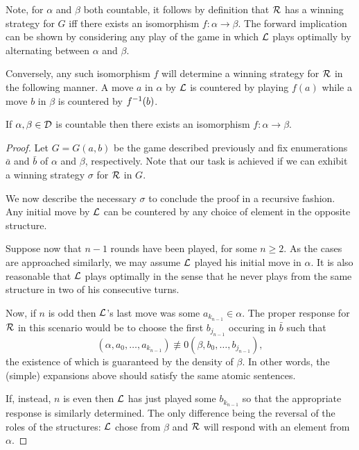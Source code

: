 Note, for $\alpha$ and $\beta$ both countable, it follows by definition
that $\mathcal{R}$ has a winning strategy for $G$ iff there exists an isomorphism
$f\colon\alpha\to\beta$.  The forward implication can be shown by considering
any play of the game in which $\mathcal{L}$ plays optimally by alternating between
$\alpha$ and $\beta$.

Conversely, any such isomorphism $f$ will determine a winning strategy for
$\mathcal{R}$ in the following manner.  A move $a$ in $\alpha$ by $\mathcal{L}$ is
countered by playing $f(a)$ while a move $b$ in $\beta$ is countered by
${f}^{-1}(b)$.

\begin{thm}\label{thm:cantor}
	If $\alpha,\beta\in\mathcal{D}$ is countable then there exists an isomorphism
	$f\colon\alpha\to\beta$.
\end{thm}
\begin{proof}
	Let $G=G(a,b)$ be the game described previously and fix enumerations
	$\bar{a}$ and $\bar{b}$ of $\alpha$ and $\beta$, respectively.  Note that
	our task is achieved if we can exhibit a winning strategy $\sigma$ for
	$\mathcal{R}$ in $G$.

	We now describe the necessary $\sigma$ to conclude the proof in a recursive
	fashion.  Any initial move by $\mathcal{L}$ can be countered by any choice of
	element in the opposite structure.

	Suppose now that $n-1$ rounds have been played, for some $n\geq 2$.  As the
	cases are approached similarly, we may assume $\mathcal{L}$ played his initial
	move in $\alpha$.  It is also reasonable that $\mathcal{L}$ plays optimally in the
	sense that he never plays from the same structure in two of his consecutive
	turns.

	Now, if $n$ is odd then $\mathcal{L}$'s last move was some $a_{k_{n-1}}\in\alpha$.
	The proper response for $\mathcal{R}$ in this scenario would be to choose the
	first $b_{j_{n-1}}$ occuring in $\bar{b}$ such that
	\begin{equation}
		(\alpha,a_{0},\dotsc,a_{k_{n-1}})\nequiv{0}(\beta,b_{0},\dotsc,b_{j_{n-1}}),
	\end{equation}
	the existence of which is guaranteed by the density of $\beta$.  In other
	words, the (simple) expansions above should satisfy the same atomic
	sentences.

	If, instead, $n$ is even then $\mathcal{L}$ has just played some $b_{k_{n-1}}$ so
	that the appropriate response is similarly determined.  The only difference
	being the reversal of the roles of the structures: $\mathcal{L}$ chose from $\beta$
	and $\mathcal{R}$ will respond with an element from $\alpha$.
\end{proof}

